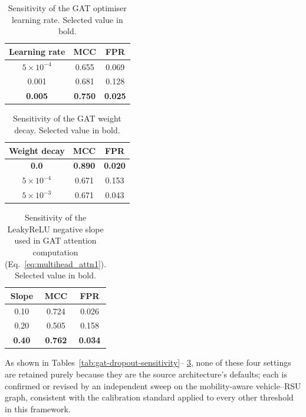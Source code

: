 \documentclass[12pt, a4paper]{report}
\begin{document}
\begin{table}[H]
\centering
\caption{Sensitivity of the GAT optimiser learning rate. Selected
value in bold.}
\label{tab:gat-lr-sensitivity}
\renewcommand{\arraystretch}{1.2}
\begin{tabular}{|c|c|c|}
\hline
\textbf{Learning rate} & \textbf{MCC} & \textbf{FPR} \\
\hline
$5\times10^{-4}$       & 0.655 & 0.069 \\
\hline
0.001                  & 0.681 & 0.128 \\
\hline
\textbf{0.005}         & \textbf{0.750} & \textbf{0.025} \\
\hline
\end{tabular}
\end{table}


\begin{table}[H]
\centering
\caption{Sensitivity of the GAT weight decay. Selected value in bold.}
\label{tab:gat-wd-sensitivity}
\renewcommand{\arraystretch}{1.2}
\begin{tabular}{|c|c|c|}
\hline
\textbf{Weight decay} & \textbf{MCC} & \textbf{FPR} \\
\hline
\textbf{0.0}    & \textbf{0.890} & \textbf{0.020} \\
\hline
$5\times10^{-4}$ & 0.671          & 0.153 \\
\hline
$5\times10^{-3}$ & 0.671          & 0.043 \\
\hline
\end{tabular}
\end{table}


\begin{table}[H]
\centering
\caption{Sensitivity of the LeakyReLU negative slope used in GAT
attention computation (Eq.~\ref{eq:multihead_attn1}). Selected
value in bold.}
\label{tab:gat-slope-sensitivity}
\renewcommand{\arraystretch}{1.2}
\begin{tabular}{|c|c|c|}
\hline
\textbf{Slope} & \textbf{MCC} & \textbf{FPR} \\
\hline
0.10          & 0.724 & 0.026 \\
\hline
0.20          & 0.505 & 0.158 \\
\hline
\textbf{0.40} & \textbf{0.762} & \textbf{0.034} \\
\hline
\end{tabular}
\end{table}


As shown in Tables~\ref{tab:gat-dropout-sensitivity}--%
\ref{tab:gat-slope-sensitivity}, none of these four settings are
retained purely because they are the source architecture's
defaults; each is confirmed or revised by an independent sweep on
the mobility-aware vehicle--RSU graph, consistent with the
calibration standard applied to every other threshold in this
framework.
\end{document}
